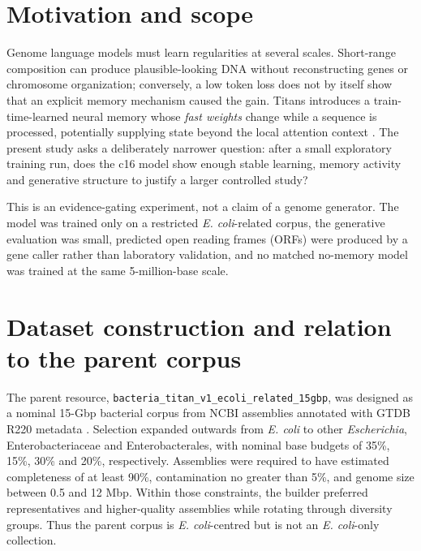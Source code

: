 \documentclass[10pt,twocolumn]{article}
\begin{document}
\section*{Motivation and scope}
Genome language models must learn regularities at several scales. Short-range composition can produce plausible-looking DNA without reconstructing genes or chromosome organization; conversely, a low token loss does not by itself show that an explicit memory mechanism caused the gain. Titans introduces a train-time-learned neural memory whose \emph{fast weights} change while a sequence is processed, potentially supplying state beyond the local attention context \cite{behrouz2025titans}. The present study asks a deliberately narrower question: after a small exploratory training run, does the c16 model show enough stable learning, memory activity and generative structure to justify a larger controlled study?

This is an evidence-gating experiment, not a claim of a genome generator. The model was trained only on a restricted \textit{E. coli}-related corpus, the generative evaluation was small, predicted open reading frames (ORFs) were produced by a gene caller rather than laboratory validation, and no matched no-memory model was trained at the same 5-million-base scale.

\section*{Dataset construction and relation to the parent corpus}
The parent resource, \nolinkurl{bacteria_titan_v1_ecoli_related_15gbp}, was designed as a nominal 15-Gbp bacterial corpus from NCBI assemblies annotated with GTDB R220 metadata \cite{gtdbr220}. Selection expanded outwards from \textit{E. coli} to other \textit{Escherichia}, Enterobacteriaceae and Enterobacterales, with nominal base budgets of 35\%, 15\%, 30\% and 20\%, respectively. Assemblies were required to have estimated completeness of at least 90\%, contamination no greater than 5\%, and genome size between 0.5 and 12 Mbp. Within those constraints, the builder preferred representatives and higher-quality assemblies while rotating through diversity groups. Thus the parent corpus is \textit{E. coli}-centred but is not an \textit{E. coli}-only collection.
\end{document}
